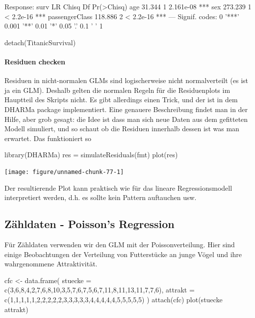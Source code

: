 \documentclass[a4paper,twoside]{tufte-book}\usepackage[]{graphicx}\usepackage[]{color}
\begin{document}
\begin{appendices}
\begin{Schunk}
\begin{Soutput}
Response: surv
               LR Chisq Df Pr(>Chisq)    
age              31.344  1  2.161e-08 ***
sex             273.239  1  < 2.2e-16 ***
passengerClass  118.886  2  < 2.2e-16 ***
---
Signif. codes:  0 '***' 0.001 '**' 0.01 '*' 0.05 '.' 0.1 ' ' 1
\end{Soutput}
\begin{Sinput}
detach(TitanicSurvival)
\end{Sinput}
\end{Schunk}

\paragraph{Residuen checken}

Residuen in nicht-normalen GLMs sind logischerweise nicht normalverteilt (es ist ja ein GLM). Deshalb gelten die normalen Regeln für die Residuenplots im Hauptteil des Skripts nicht. Es gibt allerdings einen Trick, und der ist in dem DHARMa package implementiert. Eine genauere Beschreibung findet man in der Hilfe, aber grob gesagt: die Idee ist dass man sich neue Daten aus dem gefitteten Modell simuliert, und so schaut ob die Residuen innerhalb dessen ist was man erwartet. Das funktioniert so


\begin{Schunk}
\begin{Sinput}
library(DHARMa)
res = simulateResiduals(fmt)
plot(res)
\end{Sinput}

\texttt{[image: figure/unnamed-chunk-77-1]} \end{Schunk}

Der resultierende Plot kann praktisch wie für das lineare Regressionsmodell interpretiert werden, d.h. es sollte kein Pattern auftauchen usw. 



\subsection{Zähldaten - Poisson's Regression}

Für Zähldaten verwenden wir den GLM mit der Poissonverteilung. Hier sind einige Beobachtungen der Verteilung von Futterstücke an junge Vögel und ihre wahrgenommene Attraktivität.

\begin{Schunk}
\begin{Sinput}
cfc <- data.frame(
  stuecke = c(3,6,8,4,2,7,6,8,10,3,5,7,6,7,5,6,7,11,8,11,13,11,7,7,6),
  attrakt = c(1,1,1,1,1,2,2,2,2,2,3,3,3,3,3,4,4,4,4,4,5,5,5,5,5) 
)
attach(cfc)
plot(stuecke ~ attrakt)
\end{Sinput}


\end{Schunk}
\end{appendices}
\end{document}
